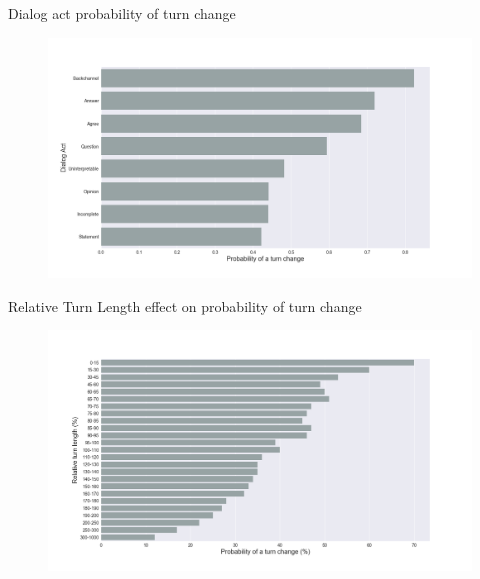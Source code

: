 \begin{frame}{Dialog act probability of turn change}
\begin{figure}[ht!]
\centering
\includegraphics[width=36em]{../scikitlearn/figures/f2.png}\vspace{-1em}
\end{figure}
\end{frame}



\begin{frame}{Relative Turn Length effect on probability of turn change}
\begin{figure}[ht!]
\centering
\includegraphics[width=36em]{../scikitlearn/figures/f5.png}\vspace{-1em}
\end{figure}
\end{frame}


